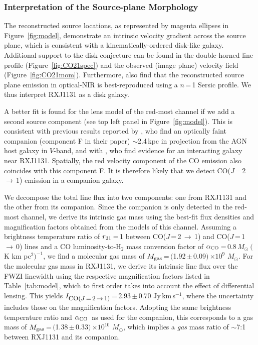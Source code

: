 \documentclass[]{emulateapj}
\newcommand{\Msun}{\mbox{$M_{\odot}$}\xspace}
\newcommand{\rarr}{$\rightarrow$}
\newcommand{\aco}{\mbox{CO($J$\,=\,1\,\rarr\,0)}\xspace}
\newcommand{\bco}{\mbox{CO($J$\,=\,2\,\rarr\,1)}\xspace}
\newcommand{\kms}{\mbox{km\,s$^{-1}$}\xspace}
\newcommand{\alphaco}{\mbox{$\alpha_{\rm CO}$}\xspace}
\newcommand{\alphaU}{\mbox{$M_{\odot}~($K\,\,km\,\,pc$^2)^{-1}$}\xspace}
\newcommand{\E}[1]{\mbox{$\times10^{#1}$}}
\newcommand{\pmm}{\,$\pm$\,}
\newcommand{\Fig}[1]{Figure~\ref{fig:#1}}
\newcommand{\Tab}[1]{Table~\ref{tab:#1}}
\begin{document}
\subsubsection{Interpretation of the Source-plane Morphology} \label{sec:caveat}
The reconstructed source locations, as represented by magenta ellipses in \Fig{model}, demonstrate
an intrinsic velocity gradient across the source plane, which is
consistent with a kinematically-ordered disk-like galaxy.
Additional support to the disk conjecture
can be found in the double-horned line profile (\Fig{CO21spec})
and the observed (image plane) velocity field (\Fig{CO21mom}). Furthermore,
 also find that the reconstructed source plane emission in optical-NIR
is best-reproduced using a $n$\,=\,1 Sersic profile.
We thus interpret RXJ1131 as a disk galaxy.

A better fit is found for the lens model of
the red-most channel if we add a second source component (see
top left panel in \Fig{model}). This is consistent with previous results
reported by \citet[hereafter B08]{Brewer08a}, who find an optically faint companion
(component F in their paper) $\sim$2.4\,kpc in projection from the AGN host galaxy in $V$-band,
and with , who find evidence for an interacting galaxy near RXJ1131.
Spatially, the red velocity component of the CO emission
also coincides with this component F. It is therefore likely that we
detect \bco emission in a companion galaxy.

We decompose the total line flux into two components:
one from RXJ1131 and the other from its companion.
Since the companion is only detected in the red-most channel, we
derive its intrinsic gas mass using the best-fit flux
densities and magnification factors obtained from the models of this channel.
Assuming a brightness temperature ratio
of $r_{\rm 21}$\,=\,1 between \bco and \aco lines and
a CO luminosity-to-H$_2$ mass conversion factor of
\alphaco\,=\,0.8\,\alphaU, we find
a molecular gas mass of $M_{\rm gas}$\,=\,$($1.92\pmm0.09$)$\,\E{9} \Msun.
For the molecular gas mass in RXJ1131, we derive
its intrinsic line flux over the FWZI linewidth
using the respective magnification
factors listed in \Tab{model}, which to
first order takes into account the effect of differential lensing.
This yields $I_{\small \bco}$\,=\,2.93\pmm0.70 Jy\,\kms,
where the uncertainty includes those on
the magnification factors.
Adopting the same brightness temperature ratio and \alphaco\ as
used for the companion, this corresponds to a gas mass of
$M_{\rm gas}$\,=\,$($1.38\pmm0.33$)$\,\E{10} \Msun, which
implies a {\em gas} mass ratio of $\sim$7:1 between RXJ1131 and its companion.
\end{document}
